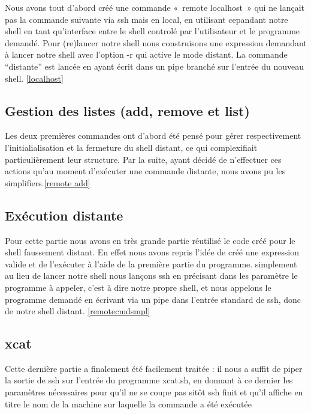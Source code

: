 \documentclass[12pt]{article}
\begin{document}
Nous avons tout d'abord créé une commande «~remote localhost~» qui ne lançait pas la commande
suivante via ssh mais en local, en utilisant cepandant notre shell en tant qu'interface entre le shell
controlé par l'utilisateur et le programme demandé. Pour (re)lancer notre shell nous construisons une
expression demandant à lancer notre shell avec l'option -r qui active le mode distant. La commande
“distante” est lancée en ayant écrit dans un pipe branché sur l'entrée du nouveau shell. \ref{localhost}

\subsection{Gestion des listes (add, remove et list)}

Les deux premières commandes ont d'abord été pensé pour gérer respectivement l'initialialisation
et la fermeture du shell distant, ce qui complexifiait particulièrement leur structure. Par la
suite, ayant décidé de n'effectuer ces actions qu'au moment d'exécuter une commande distante, nous
avons pu les simplifiers.\ref{remote add}

\subsection{Exécution distante}

Pour cette partie nous avons en très grande partie réutilisé le code créé pour le shell faussement
distant. En effet nous avons repris l'idée de créé une expression valide et de l'exécuter à l'aide
de la première partie du programme. simplement au lieu de lancer notre shell nous lançons ssh en
précisant dans les paramètre le programme à appeler, c'est à dire notre propre shell, et nous appelons
le programme demandé en écrivant via un pipe dans l'entrée standard de ssh, donc de notre shell distant. \ref{remotecmdsmpl}

\subsection{xcat}

Cette dernière partie a finalement été facilement traitée : il nous a suffit de piper la sortie de ssh
sur l'entrée du programme xcat.sh, en donnant à ce dernier les paramètres nécessaires pour qu'il ne se coupe pas
sitôt ssh finit et qu'il affiche en titre le nom de la machine sur laquelle la commande a été exécutée
\end{document}

